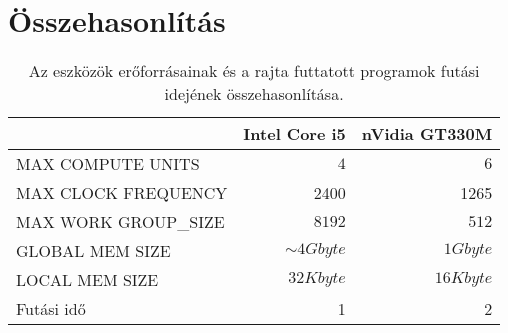 \chapter{Összehasonlítás}

	\begin{table}[!ht]
	\footnotesize
	\centering
	\caption[Eszközök futási idejének összehasonlítása]{Az eszközök erőforrásainak és a rajta futtatott
	programok futási idejének összehasonlítása.}
	\label{table:results}
	\setlength{\extrarowheight}{8pt}
	\begin{tabular}{ l | r | r}
		 & Intel Core i5 & nVidia GT330M \\ \hline
		MAX COMPUTE UNITS & $4$ & $6$\\
		MAX CLOCK FREQUENCY & 2400 & 1265 \\
		MAX WORK GROUP\_SIZE & $8192$ & $512$ \\ \hline\hline
		GLOBAL MEM SIZE & $\sim 4Gbyte$ & $1Gbyte$\\
		LOCAL MEM SIZE & $32 Kbyte$ & $16 Kbyte$\\ \hline\hline
		Futási idő & 1 & 2
	\end{tabular}
	\end{table}



